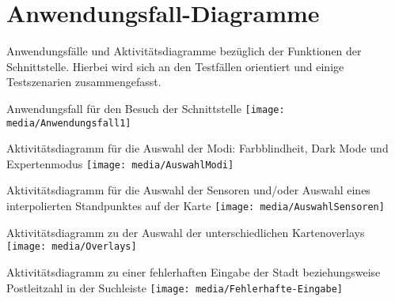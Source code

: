 \section{Anwendungsfall-Diagramme}
Anwendungsfälle und Aktivitätsdiagramme bezüglich der Funktionen der Schnittstelle. Hierbei wird sich an den Testfällen orientiert und einige Testszenarien zusammengefasst.
\newline

Anwendungsfall für den Besuch der Schnittstelle
\texttt{[image: media/Anwendungsfall1]} 
\newline

Aktivitätsdiagramm für die Auswahl der Modi: Farbblindheit, Dark Mode und Expertenmodus
\texttt{[image: media/AuswahlModi]} 
\newline

Aktivitätsdiagramm für die Auswahl der Sensoren und/oder Auswahl eines interpolierten Standpunktes auf der Karte
\texttt{[image: media/AuswahlSensoren]} 
\newline

Aktivitätsdiagramm zu der Auswahl der unterschiedlichen Kartenoverlays
\texttt{[image: media/Overlays]} 
\newline

Aktivitätsdiagramm zu einer fehlerhaften Eingabe der Stadt beziehungsweise Postleitzahl in der Suchleiste
\texttt{[image: media/Fehlerhafte-Eingabe]} 